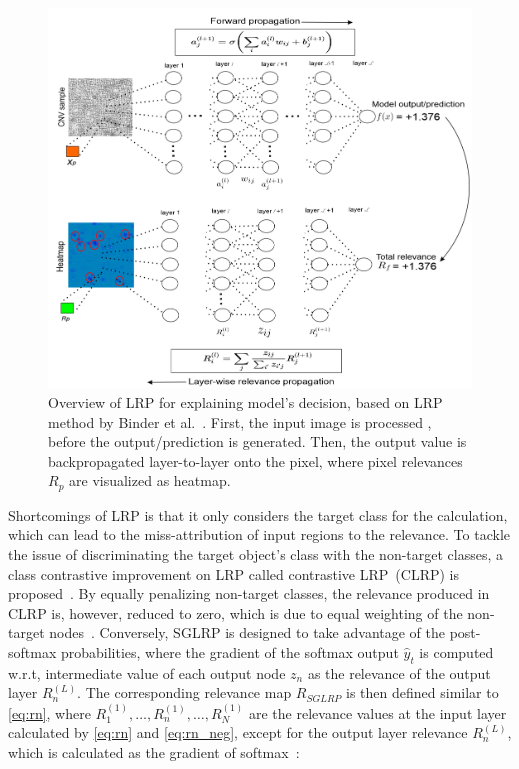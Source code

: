 \begin{figure}[h]
	\centering
	\includegraphics[scale=0.65]{images/lrp.png}	
    \caption[Overview of LRP for explaining model's decision]{Overview of LRP for explaining model's decision, based on LRP method by Binder et al.~\cite{binder2016layer}. First, the input image is processed , before the output/prediction is generated. Then, the output value is backpropagated layer-to-layer onto the pixel, where pixel relevances $R_p$ are visualized as heatmap.}	
	\label{fig:explain_with_lrp}
\end{figure}

\hspace*{3.5mm} Shortcomings of LRP is that it only considers the target class for the calculation, which can lead to the miss-attribution of input regions to the relevance. To tackle the issue of discriminating the target object’s class with the non-target classes, a class contrastive improvement on LRP called contrastive LRP~(CLRP) is proposed~\cite{LRP3}. 
By equally penalizing non-target classes, the relevance produced in CLRP is, however, reduced to zero, which is due to equal weighting of the non-target nodes~\cite{ LRP2}. Conversely, SGLRP is designed to take advantage of the post-softmax probabilities, where the gradient of the softmax output $\hat{y}_{t}$ is computed w.r.t, intermediate value of each output node $z_{n}$ as the relevance of the output layer $R_{n}^{(L)}$. The corresponding relevance map $R_{SGLRP}$ is then defined similar to \cref{eq:rn}, where $R_{1}^{(1)}, \ldots, R_{n}^{(1)}, \ldots, R_{N}^{(1)}$ are the relevance values at the input layer calculated by \cref{eq:rn} and \cref{eq:rn_neg}, except for the output layer relevance $R_{n}^{(L)}$, which is calculated as the gradient of softmax~\cite{LRP2}:

